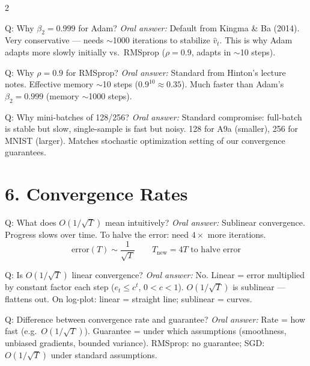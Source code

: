 \documentclass[a4paper,9pt]{article}
\newcommand{\oral}{\textit{\color{darkgray}Oral answer: }}
\begin{document}
\begin{multicols}{2}
\begin{qa}{Q: Why \(\beta_2 = 0.999\) for Adam?}
\oral Default from Kingma \& Ba (2014). Very conservative --- needs \(\sim\)1000 iterations to stabilize \(\hat{v}_t\). 
This is why Adam adapts more slowly initially vs.\ RMSprop (\(\rho=0.9\), adapts in \(\sim\)10 steps).
\end{qa}

\begin{qa}{Q: Why \(\rho = 0.9\) for RMSprop?}
\oral Standard from Hinton's lecture notes. 
Effective memory \(\sim\)10 steps (\(0.9^{10}\approx 0.35\)). 
Much faster than Adam's \(\beta_2=0.999\) (memory \(\sim\)1000 steps).
\end{qa}

\begin{qa}{Q: Why mini-batches of 128/256?}
\oral Standard compromise: full-batch is stable but slow, single-sample is fast but noisy. 
128 for A9a (smaller), 256 for MNIST (larger). 
Matches stochastic optimization setting of our convergence guarantees.
\end{qa}

\section{6. Convergence Rates}

\begin{qa}{Q: What does \(O(1/\sqrt{T})\) mean intuitively?}
\oral Sublinear convergence. Progress slows over time. 
To halve the error: need \(4\times\) more iterations.
\[
\text{error}(T)\sim \frac{1}{\sqrt{T}}
\qquad
T_{\text{new}}=4T \text{ to halve error}
\]
\end{qa}

\begin{qa}{Q: Is \(O(1/\sqrt{T})\) linear convergence?}
\oral No. Linear = error multiplied by constant factor each step (\(e_t \leq c^t\), \(0<c<1\)). 
\(O(1/\sqrt{T})\) is sublinear --- flattens out.
On log-plot: linear = straight line; sublinear = curves.
\end{qa}

\begin{qa}{Q: Difference between convergence rate and guarantee?}
\oral Rate = how fast (e.g.\ \(O(1/\sqrt{T})\)). 
Guarantee = under which assumptions (smoothness, unbiased gradients, bounded variance). 
RMSprop: no guarantee; SGD: \(O(1/\sqrt{T})\) under standard assumptions.
\end{qa}


\end{multicols}
\end{document}
